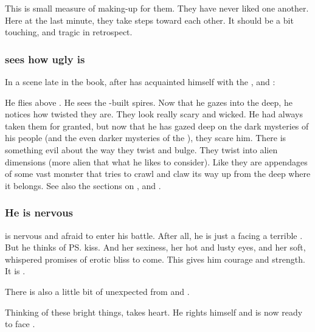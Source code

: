 This is small measure of making-up for them. 
They have never liked one another.
Here at the last minute, they take steps toward each other. 
It should be a bit touching, and tragic in retrospect. 





\subsubsection{\Teshrial sees how ugly \Nyx is}
In a scene late in the book, after \Teshrial has acquainted himself with the \noggyaleth, \neoresphain and \WanderersInDarknessEmph:
  
He flies above \Nyx.
He sees the \bane-built spires. 
Now that he gazes into the deep, he notices how twisted they are.
They look really scary and wicked.
He had always taken them for granted, but now that he has gazed deep on the dark mysteries of his people (and the even darker mysteries of the \banes), they scare him.
There is something evil about the way they twist and bulge.
They twist into alien dimensions (more alien that what he likes to consider). 
Like they are appendages of some vast monster that tries to crawl and claw its way up from the deep where it belongs. 
See also the sections on ,  and . 





\subsubsection{He is nervous}
\Teshrial{} is nervous and afraid to enter his battle. 
After all, he is just a \ketheran{} facing a terrible \shaeeroth. 
But he thinks of \ps{\Firaxel} kiss. 
And her sexiness, her hot and lusty eyes, and her soft, whispered promises of erotic bliss to come. 
This gives him courage and strength. 
It is . 

There is also a little bit of unexpected  from \Achsah and \Urizeth. 

Thinking of these bright things, \Teshrial{} takes heart. 
He rights himself and is now ready to face \Ishnaruchaefir. 









